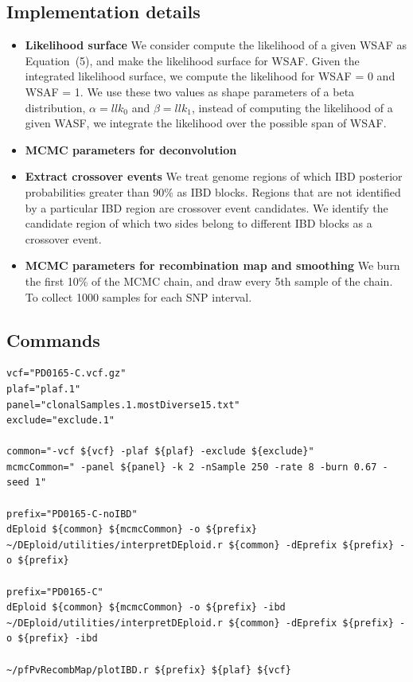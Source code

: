 \documentclass{article}
\begin{document}
\subsection{Implementation details}
\begin{itemize}


  \item {\bf Likelihood surface} We consider compute the likelihood of a given WSAF as \cite{Zhu2017} Equation~(5), and make the likelihood surface for WSAF. Given the integrated likelihood surface, we compute the likelihood for WSAF = 0 and WSAF = 1. We use these two values as shape parameters of a beta distribution, $\alpha = llk_{0}$ and $\beta = llk_{1}$, instead of computing the likelihood of a given WASF, we integrate the likelihood over the possible span of WSAF.


\item {\bf MCMC parameters for deconvolution}

  \item {\bf Extract crossover events} We treat genome regions of which IBD posterior probabilities greater than 90\% as IBD blocks. Regions that are not identified by a particular IBD region are crossover event candidates. We identify the candidate region of which two sides belong to different IBD blocks as a crossover event.

\item {\bf MCMC parameters for recombination map and smoothing}
We burn the first 10\% of the MCMC chain, and draw every 5th sample of the chain. To collect 1000 samples for each SNP interval.
\end{itemize}

\subsection{Commands}

\linespread{1}
\begin{lstlisting}
vcf="PD0165-C.vcf.gz"
plaf="plaf.1"
panel="clonalSamples.1.mostDiverse15.txt"
exclude="exclude.1"

common="-vcf ${vcf} -plaf ${plaf} -exclude ${exclude}"
mcmcCommon=" -panel ${panel} -k 2 -nSample 250 -rate 8 -burn 0.67 -seed 1"

prefix="PD0165-C-noIBD"
dEploid ${common} ${mcmcCommon} -o ${prefix}
~/DEploid/utilities/interpretDEploid.r ${common} -dEprefix ${prefix} -o ${prefix}

prefix="PD0165-C"
dEploid ${common} ${mcmcCommon} -o ${prefix} -ibd
~/DEploid/utilities/interpretDEploid.r ${common} -dEprefix ${prefix} -o ${prefix} -ibd

~/pfPvRecombMap/plotIBD.r ${prefix} ${plaf} ${vcf}
\end{lstlisting}
\end{document}
